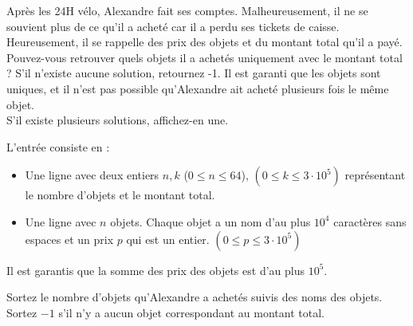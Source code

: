 \problemname{\problemyamlname}

\newcommand{\maxk}{3 \cdot 10^5}
\newcommand{\maxn}{64}

Après les 24H vélo, Alexandre fait ses comptes. Malheureusement, il ne se souvient plus de ce qu'il a acheté car il a perdu ses tickets de caisse. Heureusement, il se rappelle des prix des objets et du montant total qu'il a payé. Pouvez-vous retrouver quels objets il a achetés uniquement avec le montant total ? S'il n'existe aucune solution, retournez -1. Il est garanti que les objets sont uniques, et il n'est pas possible qu'Alexandre ait acheté plusieurs fois le même objet. \\
S'il existe plusieurs solutions, affichez-en une.

\begin{Input}
    L'entrée consiste en :
    \begin{itemize}
        \item Une ligne avec deux entiers $n, k$ ($0 \leq n \leq \maxn$), $(0 \leq k \leq \maxk)$ représentant le nombre d'objets et le montant total.
        \item Une ligne avec $n$ objets. Chaque objet a un nom d'au plus $10^4$ caractères sans espaces et un prix $p$ qui est un entier. $(0 \leq p \leq \maxk)$
    \end{itemize}
    Il est garantis que la somme des prix des objets est d'au plus $10^5$.
\end{Input}

\begin{Output}
    Sortez le nombre d'objets qu'Alexandre a achetés suivis des noms des objets. Sortez $-1$ s'il n'y a aucun objet correspondant au montant total.
\end{Output}
